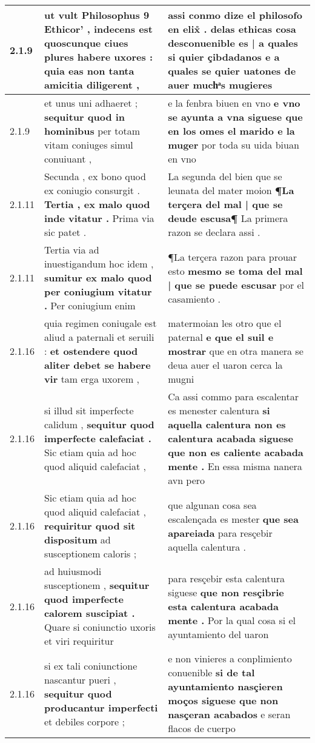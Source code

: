 \begin{tabular}{|p{1cm}|p{6.5cm}|p{6.5cm}|}
2.1.9 & ut vult Philosophus 9 Ethicor’ , \textbf{ indecens est quoscunque ciues plures habere uxores : } quia eas non tanta amicitia diligerent , & assi conmo dize el philosofo en elix̊ . \textbf{ delas ethicas cosa desconuenible es | a quales si quier çibdadanos } e a quales se quier uatones de auer muchͣs mugieres \\\hline
2.1.9 & et unus uni adhaeret ; \textbf{ sequitur quod in hominibus } per totam vitam coniuges simul conuiuant , & e la fenbra biuen en vno \textbf{ e vno se ayunta a vna siguese que en los omes el marido e la muger } por toda su uida biuan en vno \\\hline
2.1.11 & Secunda , ex bono quod ex coniugio consurgit . \textbf{ Tertia , ex malo quod inde vitatur . } Prima via sic patet . & La segunda del bien que se leunata del mater moion \textbf{ ¶La terçera del mal | que se deude escusa¶ } La primera razon se declara assi . \\\hline
2.1.11 & Tertia via ad inuestigandum hoc idem , \textbf{ sumitur ex malo quod per coniugium vitatur . } Per coniugium enim & ¶La terçera razon para prouar esto \textbf{ mesmo se toma del mal | que se puede escusar } por el casamiento . \\\hline
2.1.16 & quia regimen coniugale est aliud a paternali et seruili : \textbf{ et ostendere quod aliter debet se habere vir } tam erga uxorem , & matermoian les otro que el paternal \textbf{ e que el suil e mostrar } que en otra manera se deua auer el uaron cerca la mugni \\\hline
2.1.16 & si illud sit imperfecte calidum , \textbf{ sequitur quod imperfecte calefaciat . } Sic etiam quia ad hoc quod aliquid calefaciat , & Ca assi commo para escalentar es menester calentura \textbf{ si aquella calentura non es calentura acabada siguese que non es caliente acabada mente . } En essa misma nanera avn pero \\\hline
2.1.16 & Sic etiam quia ad hoc quod aliquid calefaciat , \textbf{ requiritur quod sit dispositum } ad susceptionem caloris ; & que algunan cosa sea escalençada es mester \textbf{ que sea apareiada } para resçebir aquella calentura . \\\hline
2.1.16 & ad huiusmodi susceptionem , \textbf{ sequitur quod imperfecte calorem suscipiat . } Quare si coniunctio uxoris et viri requiritur & para resçebir esta calentura siguese \textbf{ que non resçibrie esta calentura acabada mente . } Por la qual cosa si el ayuntamiento del uaron \\\hline
2.1.16 & si ex tali coniunctione nascantur pueri , \textbf{ sequitur quod producantur imperfecti } et debiles corpore ; & e non vinieres a conplimiento conuenible \textbf{ si de tal ayuntamiento nasçieren moços siguese que non nasçeran acabados } e seran flacos de cuerpo \\\hline

\end{tabular}
